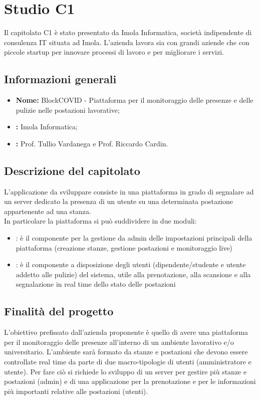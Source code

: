\section{Studio C1} \label{_c1}
Il capitolato C1 è stato presentato da Imola Informatica, società indipendente di consulenza IT situata ad Imola. L'azienda lavora sia con grandi aziende che con piccole startup per innovare processi di lavoro e per migliorare i servizi.\\

\subsection{Informazioni generali}
\begin{itemize}
	\item \textbf{Nome:} BlockCOVID - Piattaforma per il monitoraggio delle presenze e delle pulizie nelle postazioni lavorative;
	\item \textbf{:} Imola Informatica;
	\item \textbf{:} Prof. Tullio Vardanega e Prof. Riccardo Cardin.
\end{itemize}

\subsection{Descrizione del capitolato}
L'applicazione da sviluppare consiste in una piattaforma in grado di segnalare ad un server dedicato la presenza di un utente su una determinata postazione appartenente ad una stanza. \\
In particolare la piattaforma si può suddividere in due moduli:
\begin{itemize}
	\item {}: è il componente per la gestione da admin delle impostazioni principali della piattaforma (creazione stanze, gestione postazioni e monitoraggio live)
	\item {}: è il componente a disposizione degli utenti (dipendente/studente e utente addetto alle pulizie) del sistema, utile alla prenotazione, alla scansione e alla segnalazione in real time dello stato delle postazioni
\end{itemize}

\subsection{Finalità del progetto}
L'obiettivo prefissato dall'azienda proponente è quello di avere una piattaforma per il monitoraggio delle presenze all'interno di un ambiente lavorativo e/o universitario. L'ambiente sarà formato da stanze e postazioni che devono essere controllate real time da parte di due macro-tipologie di utenti (amministratore e utente). Per fare ciò si richiede lo sviluppo di un server per gestire più stanze e postazioni (admin) e di una applicazione per la prenotazione e per le informazioni più importanti relative alle postazioni (utenti).

